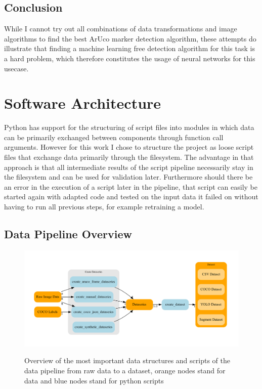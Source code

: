 \documentclass[10pt]{book}
\begin{document}
\subsection{Conclusion}

While I cannot try out all combinations of data transformations and image algorithms to find the best \ac{ArUco} marker detection algorithm, these attempts do illustrate that finding a machine learning free detection algorithm for this task is a hard problem, which therefore constitutes the usage of neural networks for this usecase.

\section{Software Architecture}

Python has support for the structuring of script files into modules in which data can be primarily exchanged between components through function call arguments. However for this work I chose to structure the project as loose script files that exchange data primarily through the filesystem. The advantage in that approach is that all intermediate results of the script pipeline necessarily stay in the filesystem and can be used for validation later. Furthermore should there be an error in the execution of a script later in the pipeline, that script can easily be started again with adapted code and tested on the input data it failed on without having to run all previous steps, for example retraining a model.

\subsection{Data Pipeline Overview}

\begin{figure}
  \caption{Overview of the most important data structures and scripts of the data pipeline from raw data to a dataset, orange nodes stand for data and blue nodes stand for python scripts}
  \includegraphics[width=\textwidth]{graph/arch_data}
  \label{fig:arch_data}
\end{figure}
\end{document}
